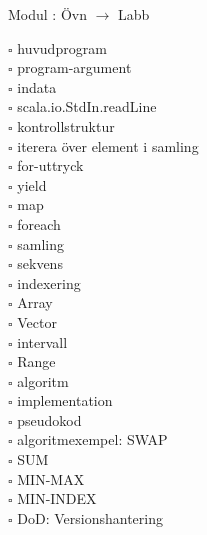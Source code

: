 
    Modul : Övn  $\rightarrow$ Labb 
    \begin{multicols}{3}\SlideFontTiny
    $\square$ huvudprogram \\
$\square$ program-argument \\
$\square$ indata \\
$\square$ scala.io.StdIn.readLine \\
$\square$ kontrollstruktur \\
$\square$ iterera över element i samling \\
$\square$ for-uttryck \\
$\square$ yield \\
$\square$ map \\
$\square$ foreach \\
$\square$ samling \\
$\square$ sekvens \\
$\square$ indexering \\
$\square$ Array \\
$\square$ Vector \\
$\square$ intervall \\
$\square$ Range \\
$\square$ algoritm \\
$\square$ implementation \\
$\square$ pseudokod \\
$\square$ algoritmexempel: SWAP \\
$\square$ SUM \\
$\square$ MIN-MAX \\
$\square$ MIN-INDEX \\
$\square$ DoD: Versionshantering \\
    \end{multicols}
    